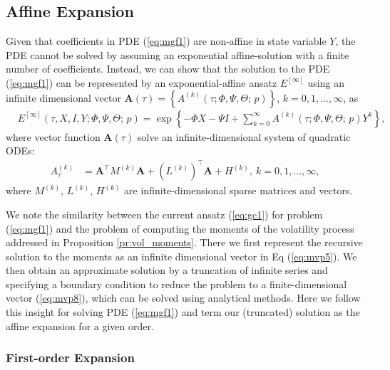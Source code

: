 \documentclass[pdftex,11pt,a4paper] {article}
\begin{document}
\subsection{Affine Expansion}


Given that coefficients in PDE (\ref{eq:mgf1}) are non-affine in state variable $Y$, the PDE cannot be solved by assuming an exponential affine-solution with a finite number of coefficients. Instead, we can show that the solution to the PDE (\ref{eq:mgf1}) can be represented by an exponential-affine ansatz $E^{[\infty]}$ using an infinite dimensional vector $\mathbf{A}(\tau)=\left\{A^{(k)}(\tau;\Phi,\Psi,\Theta;\,p)\right\}$,  $k=0,1,...,\infty$, as
\begin{equation}\label{eq:gc1}
\begin{split}
& E^{[\infty]}(\tau,X,I,Y; \Phi,\Psi,\Theta;\,p)= \exp \left\{-\Phi X-\Psi I +  \sum^{\infty}_{k=0}A^{(k)}(\tau;\Phi,\Psi,\Theta;\,p)Y^{k}  \right\},
\end{split}
\end{equation}
where vector function $\mathbf{A}(\tau)$ solve an infinite-dimensional system of quadratic ODEs:
\begin{equation}
\begin{split}
A^{(k)}_\tau&=\mathbf{A}^\top M^{(k)}\mathbf{A} + \left(L^{(k)}\right)^\top\mathbf{A} + H^{(k)}, \ k=0,1,...,\infty,
\end{split}
\end{equation}
where $M^{(k)}$, $L^{(k)}$, $H^{(k)}$ are infinite-dimensional sparse matrices and vectors. 


We note the similarity between the current ansatz (\ref{eq:gc1}) for problem (\ref{eq:mgf1}) and the problem of computing the moments of the volatility process addressed in Proposition \ref{pr:vol_moments}. There we first represent the recursive solution to the moments as an infinite dimensional vector in Eq (\ref{eq:mvp5}). We then obtain an approximate solution by a truncation of infinite series and specifying a boundary condition to reduce the problem to a finite-dimensional vector (\ref{eq:mvp8}), which can be solved using analytical methods. Here we follow this insight for solving PDE (\ref{eq:mgf1}) and term our (truncated) solution as the affine expansion for a given order.


\subsubsection{First-order Expansion}
 
\end{document}
